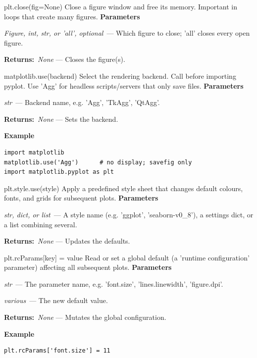 \documentclass[10pt]{article}
\newenvironment{params}
  {\smallskip\textbf{\small\color{accent}Parameters}\par\nopagebreak
   \begin{description}[leftmargin=1.3em,itemsep=1.5pt,parsep=0pt,topsep=1pt,
      labelindent=0pt,style=sameline,font=\normalfont]}
  {\end{description}}
\newcommand{\pitem}[3]{\item[{\ttfamily\color{accent}#1}]{\itshape #2}\ --- #3}
\newcommand{\preturn}[2]{\smallskip\textbf{\small\color{accent}Returns:}\ {\itshape #1} --- #2\par}
\begin{document}
\begin{func}{plt.close(fig=None)}
Close a figure window and free its memory. Important in loops that create many figures.
\begin{params}
\pitem{fig}{Figure, int, str, or 'all', optional}{Which figure to close; 'all' closes every open figure.}
\end{params}
\preturn{None}{Closes the figure(s).}
\end{func}
\medskip

\begin{func}{matplotlib.use(backend)}
Select the rendering backend. Call before importing pyplot. Use 'Agg' for headless scripts/servers that only save files.
\begin{params}
\pitem{backend}{str}{Backend name, e.g. 'Agg', 'TkAgg', 'QtAgg'.}
\end{params}
\preturn{None}{Sets the backend.}
\smallskip\textbf{\small\color{accent}Example}
\begin{lstlisting}[style=py]
import matplotlib
matplotlib.use('Agg')      # no display; savefig only
import matplotlib.pyplot as plt
\end{lstlisting}
\end{func}
\medskip

\begin{func}{plt.style.use(style)}
Apply a predefined style sheet that changes default colours, fonts, and grids for subsequent plots.
\begin{params}
\pitem{style}{str, dict, or list}{A style name (e.g. 'ggplot', 'seaborn-v0\_8'), a settings dict, or a list combining several.}
\end{params}
\preturn{None}{Updates the defaults.}
\end{func}
\medskip

\begin{func}{plt.rcParams[key] = value}
Read or set a global default (a 'runtime configuration' parameter) affecting all subsequent plots.
\begin{params}
\pitem{key}{str}{The parameter name, e.g. 'font.size', 'lines.linewidth', 'figure.dpi'.}
\pitem{value}{various}{The new default value.}
\end{params}
\preturn{None}{Mutates the global configuration.}
\smallskip\textbf{\small\color{accent}Example}
\begin{lstlisting}[style=py]
plt.rcParams['font.size'] = 11
\end{lstlisting}
\end{func}
\medskip
\end{document}
